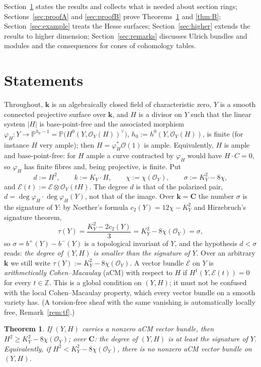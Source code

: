 \documentclass[11pt]{amsart}
\newtheorem{theorem}{Theorem}[section]
\theoremstyle{remark}
\theoremstyle{definition}
\newcommand{\PP}{\mathbb{P}}
\newcommand{\ZZ}{\mathbb{Z}}
\newcommand{\CC}{\mathbf{C}}
\newcommand{\bk}{\mathbf{k}}
\newcommand{\cO}{\mathcal{O}}
\newcommand{\cE}{\mathcal{E}}
\begin{document}
Section~\ref{sec:statements} states the results and collects what is needed about section rings; Sections~\ref{sec:proofA} and \ref{sec:proofB} prove Theorems~\ref{thm:A} and \ref{thm:B}; Section~\ref{sec:example} treats the Hesse surfaces; Section~\ref{sec:higher} extends the results to higher dimension; Section~\ref{sec:remarks} discusses Ulrich bundles and modules and the consequences for cones of cohomology tables.

\section{Statements}\label{sec:statements}

Throughout, $\bk$ is an algebraically closed field of characteristic zero, $Y$ is a smooth connected projective surface over $\bk$, and $H$ is a divisor on $Y$ such that the linear system $|H|$ is base-point-free and the associated morphism $\varphi_H\colon Y\to\PP^{h_0-1}=\PP\bigl(H^0(Y,\cO_Y(H))^\vee\bigr)$, $h_0:=h^0(Y,\cO_Y(H))$, is finite (for instance $H$ very ample); then $H=\varphi_H^*\cO(1)$ is ample. Equivalently, $H$ is ample and base-point-free: for $H$ ample a curve contracted by $\varphi_H$ would have $H\cdot C=0$, so $\varphi_H$ has finite fibres and, being projective, is finite. Put
\[
d:=H^2,\qquad k:=K_Y\cdot H,\qquad \chi:=\chi(\cO_Y),\qquad \sigma:=K_Y^2-8\chi ,
\]
and $\cE(t):=\cE\otimes\cO_Y(tH)$. The degree $d$ is that of the polarized pair, $d=\deg\varphi_H\cdot\deg\varphi_H(Y)$, not that of the image. Over $\bk=\CC$ the number $\sigma$ is the signature of $Y$: by Noether's formula $c_2(Y)=12\chi-K_Y^2$ and Hirzebruch's signature theorem,
\[
\tau(Y)=\frac{K_Y^2-2c_2(Y)}{3}=K_Y^2-8\chi(\cO_Y)=\sigma ,
\]
so $\sigma=b^+(Y)-b^-(Y)$ is a topological invariant of $Y$, and the hypothesis $d<\sigma$ reads: \emph{the degree of $(Y,H)$ is smaller than the signature of $Y$}. Over an arbitrary $\bk$ we still write $\tau(Y):=K_Y^2-8\chi(\cO_Y)$. A vector bundle $\cE$ on $Y$ is \emph{arithmetically Cohen--Macaulay} (aCM) with respect to $H$ if $H^1(Y,\cE(t))=0$ for every $t\in\ZZ$. This is a global condition on $(Y,H)$; it must not be confused with the local Cohen--Macaulay property, which every vector bundle on a smooth variety has. (A torsion-free sheaf with the same vanishing is automatically locally free, Remark~\ref{rem:tf}.)

\begin{theorem}\label{thm:A}
If $(Y,H)$ carries a nonzero aCM vector bundle, then $H^2\ge K_Y^2-8\chi(\cO_Y)$; over $\CC$: the degree of $(Y,H)$ is at least the signature of $Y$. Equivalently, if $H^2<K_Y^2-8\chi(\cO_Y)$, there is no nonzero aCM vector bundle on $(Y,H)$.
\end{theorem}
\end{document}
